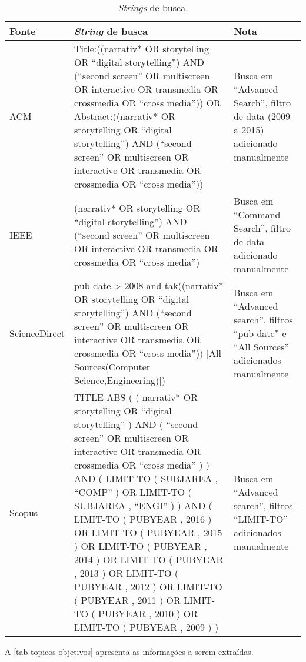 \documentclass[
article,			%
11pt,				%
oneside,			%
a4paper,			%
english,			%
brazil,				%
sumario=tradicional
]{abntex2}
\begin{document}
  \begin{table}[htb]
    \ABNTEXfontereduzida
    \caption[\textit{Strings} de busca]{\textit{Strings} de busca.}
    \label{tab-queries2}
    \begin{tabular}{p{2.0cm}|p{9.3cm}|p{2.8cm}}
      \textbf{Fonte} & \textbf{\textit{String} de busca} & \textbf{Nota} \\
      \hline
      ACM & Title:((narrativ* OR storytelling OR ``digital storytelling'') AND (``second screen'' OR multiscreen OR interactive OR transmedia OR crossmedia OR ``cross media'')) OR Abstract:((narrativ* OR storytelling OR ``digital storytelling'') AND (``second screen'' OR multiscreen OR interactive OR transmedia OR crossmedia OR ``cross media'')) & Busca em ``Advanced Search'', filtro de data (2009 a 2015) adicionado manualmente \\
      \hline
      IEEE & (narrativ* OR storytelling OR ``digital storytelling'') AND (``second screen'' OR multiscreen OR interactive OR transmedia OR crossmedia OR ``cross media'') & Busca em ``Command Search'', filtro de data adicionado manualmente \\
      \hline
      ScienceDirect & pub-date > 2008 and tak((narrativ* OR storytelling OR ``digital storytelling'') AND (``second screen'' OR multiscreen OR interactive OR transmedia OR crossmedia OR ``cross media'')) [All Sources(Computer Science,Engineering)]) & Busca em ``Advanced search'', filtros ``pub-date'' e ``All Sources'' adicionados manualmente \\
      \hline
      Scopus & TITLE-ABS ( ( narrativ*  OR  storytelling  OR  ``digital storytelling'' )  AND  ( ``second screen''  OR  multiscreen  OR  interactive  OR  transmedia  OR  crossmedia  OR  ``cross media'' ) )  AND  ( LIMIT-TO ( SUBJAREA ,  ``COMP'' )  OR  LIMIT-TO ( SUBJAREA ,  ``ENGI'' ) )  AND  ( LIMIT-TO ( PUBYEAR ,  2016 )  OR  LIMIT-TO ( PUBYEAR ,  2015 )  OR  LIMIT-TO ( PUBYEAR ,  2014 )  OR  LIMIT-TO ( PUBYEAR ,  2013 )  OR  LIMIT-TO ( PUBYEAR ,  2012 )  OR  LIMIT-TO ( PUBYEAR ,  2011 )  OR  LIMIT-TO ( PUBYEAR ,  2010 )  OR  LIMIT-TO ( PUBYEAR ,  2009 ) ) & Busca em ``Advanced search'', filtros ``LIMIT-TO'' adicionados manualmente \\
    \end{tabular}
  \end{table}

  A \autoref{tab-topicos-objetivos} apresenta as informações a serem extraídas.
\end{document}
